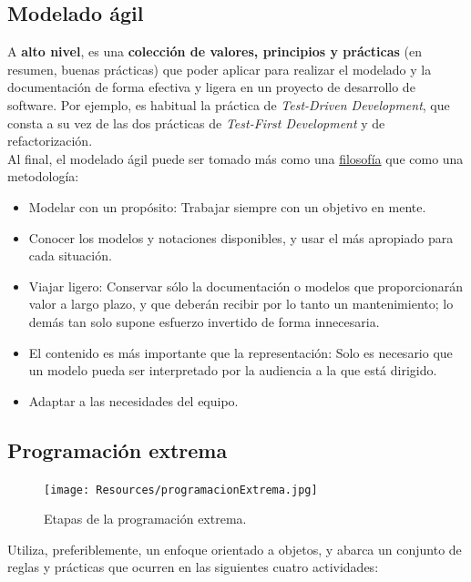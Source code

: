 \subsection{Modelado ágil}

A \textbf{alto nivel}, es una \textbf{colección de valores, principios y prácticas} (en resumen, buenas prácticas) que poder aplicar para realizar el modelado y la documentación de forma efectiva y ligera en un proyecto de desarrollo de software. Por ejemplo, es habitual la práctica de \textit{Test-Driven Development}, que consta a su vez de las dos prácticas de \textit{Test-First Development} y de refactorización.\\

Al final, el modelado ágil puede ser tomado más como una \uline{filosofía} que como una metodología:

\begin{itemize}
   \item Modelar con un propósito: Trabajar siempre con un objetivo en mente.
   \item Conocer los modelos y notaciones disponibles, y usar el más apropiado para cada situación.
   \item Viajar ligero: Conservar sólo la documentación o modelos que proporcionarán valor a largo plazo, y que deberán recibir por lo tanto un mantenimiento; lo demás tan solo supone esfuerzo invertido de forma innecesaria.
   \item El contenido es más importante que la representación: Solo es necesario que un modelo pueda ser interpretado por la audiencia a la que está dirigido.
   \item Adaptar a las necesidades del equipo.
\end{itemize}

\subsection{Programación extrema}

\begin{figure}[H]
   \centering
   \texttt{[image: Resources/programacionExtrema.jpg]}
   \caption{Etapas de la programación extrema.}
   \label{fig:programacionExtrema}
\end{figure}

Utiliza, preferiblemente, un enfoque orientado a objetos, y abarca un conjunto de reglas y prácticas que ocurren en las siguientes cuatro actividades:

